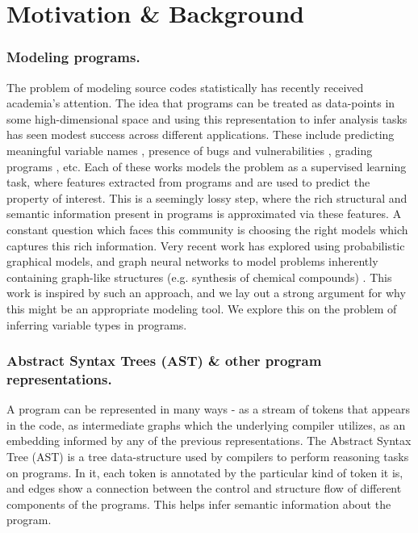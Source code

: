 \section{Motivation \& Background}
\label{sec:motivation}

\subsubsection{Modeling programs.} The problem of modeling source codes statistically has recently received academia's attention. The idea that programs can be treated as data-points in some high-dimensional space and using this representation to infer analysis tasks has seen modest success across different applications. These include predicting meaningful variable names \cite{}, presence of bugs and vulnerabilities \cite{}, grading programs \cite{}, etc. Each of these works models the problem as a supervised learning task, where features extracted from programs and are used to predict the property of interest. This is a seemingly lossy step, where the rich structural and semantic information present in programs is approximated via these features. A constant question which faces this community is choosing the right models which captures this rich information. Very recent work has explored using probabilistic graphical models, and graph neural networks to model problems inherently containing graph-like structures (e.g. synthesis of chemical compounds) \cite{}. This work is inspired by such an approach, and we lay out a strong argument for why this might be an appropriate modeling tool. We explore this on the problem of inferring variable types in programs.

\subsubsection{Abstract Syntax Trees (AST) \& other program representations.} A program can be represented in many ways - as a stream of tokens that appears in the code, as intermediate graphs which the underlying compiler utilizes, as an embedding informed by any of the previous representations. The Abstract Syntax Tree (AST) is a tree data-structure used by compilers to perform reasoning tasks on programs.  In it, each token is annotated by the particular kind of token it is, and edges show a connection between the control and structure flow of different components of the programs. This helps infer semantic information about the program.

